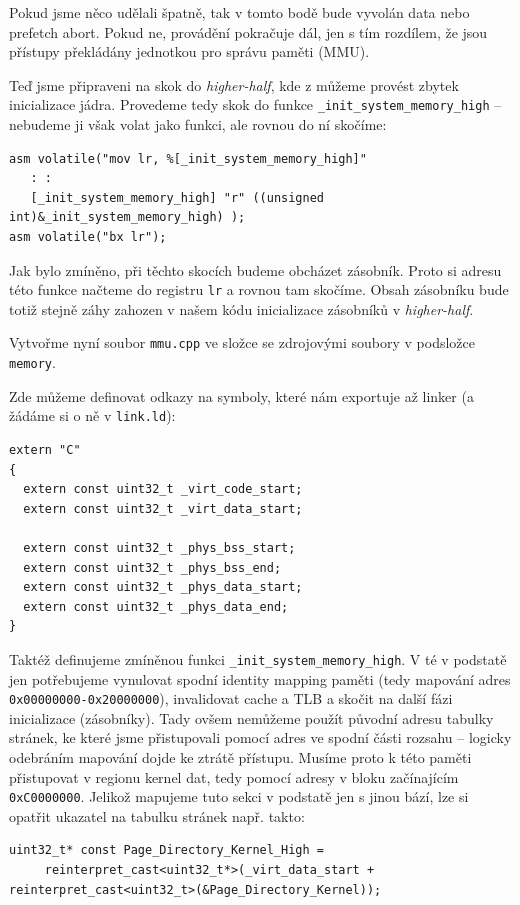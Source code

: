 \documentclass{article}
\begin{document}
Pokud jsme něco udělali špatně, tak v tomto bodě bude vyvolán data nebo prefetch abort. Pokud ne, provádění pokračuje dál, jen s tím rozdílem, že jsou přístupy překládány jednotkou pro správu paměti (MMU).

Teď jsme připraveni na skok do \emph{higher-half}, kde z můžeme provést zbytek inicializace jádra. Provedeme tedy skok do funkce \texttt{\_init\_system\_memory\_high} -- nebudeme ji však volat jako funkci, ale rovnou do ní skočíme:

\begin{lstlisting}
asm volatile("mov lr, %[_init_system_memory_high]"
   : :
   [_init_system_memory_high] "r" ((unsigned int)&_init_system_memory_high) );
asm volatile("bx lr");
\end{lstlisting}

Jak bylo zmíněno, při těchto skocích budeme obcházet zásobník. Proto si adresu této funkce načteme do registru {\tt lr} a rovnou tam skočíme. Obsah zásobníku bude totiž stejně záhy zahozen v našem kódu inicializace zásobníků v \emph{higher-half}.

Vytvořme nyní soubor \texttt{mmu.cpp} ve složce se zdrojovými soubory v podsložce \texttt{memory}.

Zde můžeme definovat odkazy na symboly, které nám exportuje až linker (a žádáme si o ně v {\tt link.ld}):
\begin{lstlisting}
extern "C"
{
  extern const uint32_t _virt_code_start;
  extern const uint32_t _virt_data_start;

  extern const uint32_t _phys_bss_start;
  extern const uint32_t _phys_bss_end;
  extern const uint32_t _phys_data_start;
  extern const uint32_t _phys_data_end;
}
\end{lstlisting}

Taktéž definujeme zmíněnou funkci \texttt{\_init\_system\_memory\_high}. V té v podstatě jen potřebujeme vynulovat spodní identity mapping paměti (tedy mapování adres {\tt 0x00000000-0x20000000}), invalidovat cache a TLB a skočit na další fázi inicializace (zásobníky). Tady ovšem nemůžeme použít původní adresu tabulky stránek, ke které jsme přistupovali pomocí adres ve spodní části rozsahu -- logicky odebráním mapování dojde ke ztrátě přístupu. Musíme proto k této paměti přistupovat v regionu kernel dat, tedy pomocí adresy v bloku začínajícím {\tt 0xC0000000}. Jelikož mapujeme tuto sekci v podstatě jen s jinou bází, lze si opatřit ukazatel na tabulku stránek např. takto:

\begin{lstlisting}
uint32_t* const Page_Directory_Kernel_High =
     reinterpret_cast<uint32_t*>(_virt_data_start + reinterpret_cast<uint32_t>(&Page_Directory_Kernel));
\end{lstlisting}
\end{document}
